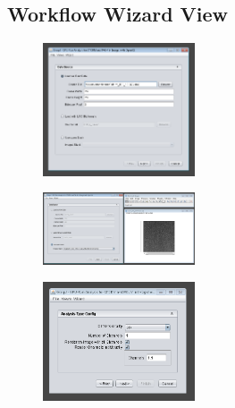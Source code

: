 \documentclass[aspectratio=169]{beamer}
\begin{document}
\subsection{Workflow Wizard View}

\begin{frame}
 
 \begin{figure}[h!]
    \centering	\includegraphics[width=0.4\textwidth]{./images/graspj_workflow1.png} 
    \caption{}
    \label{fig:workflow}
    \end{figure} 
 
\end{frame}


\begin{frame}
 
 \begin{figure}[h!]
    \centering	\includegraphics[width=0.4\textwidth]{./images/graspj_workflow2.png} 
    \caption{}
    \label{fig:workflow2}
    \end{figure} 
 
\end{frame}

\begin{frame}
 
 \begin{figure}[h!]
    \centering	\includegraphics[width=0.4\textwidth]{./images/graspj_workflow3.png} 
    \caption{}
    \label{fig:workflow3}
    \end{figure} 
 
\end{frame}
\end{document}
